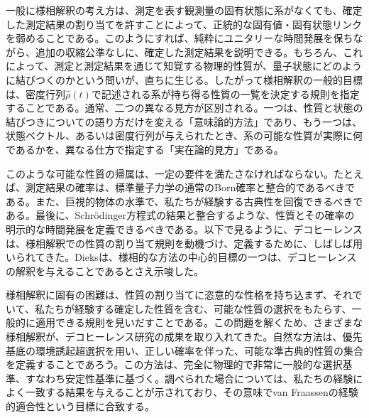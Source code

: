 \hypertarget{srcpage:345}{}\label{srcpage:345}
一般に様相解釈の考え方は、測定を表す観測量の固有状態に系がなくても、確定した測定結果の割り当てを許すことによって、正統的な固有値・固有状態リンクを弱めることである。このようにすれば、純粋にユニタリーな時間発展を保ちながら、追加の収縮公準なしに、確定した測定結果を説明できる。もちろん、これによって、測定と測定結果を通じて知覚する物理的性質が、量子状態にどのように結びつくのかという問いが、直ちに生じる。したがって様相解釈の一般的目標は、密度行列$\hat\rho(t)$で記述される系が持ち得る性質の一覧を決定する規則を指定することである。通常、二つの異なる見方が区別される。一つは、性質と状態の結びつきについての語り方だけを変える「意味論的方法」であり、もう一つは、状態ベクトル、あるいは密度行列が与えられたとき、系の可能な性質が実際に何であるかを、異なる仕方で指定する「実在論的見方」である。

このような可能な性質の帰属は、一定の要件を満たさなければならない。たとえば、測定結果の確率は、標準量子力学の通常のBorn確率と整合的であるべきである。また、巨視的物体の水準で、私たちが経験する古典性を回復できるべきである。最後に、Schrödinger方程式の結果と整合するような、性質とその確率の明示的な時間発展を定義できるべきである。以下で見るように、デコヒーレンスは、様相解釈での性質の割り当て規則を動機づけ、定義するために、しばしば用いられてきた。Dieks\cite{ref430,ref431}は、様相的な方法の中心的目標の一つは、デコヒーレンスの解釈を与えることであるとさえ示唆した。

様相解釈に固有の困難は、性質の割り当てに恣意的な性格を持ち込まず、それでいて、私たちが経験する確定した性質を含む、可能な性質の選択をもたらす、一般的に適用できる規則を見いだすことである。この問題を解くため、さまざまな様相解釈が、デコヒーレンス研究の成果を取り入れてきた。自然な方法は、優先基底の環境誘起超選択を用い、正しい確率を伴った、可能な準古典的性質の集合を定義することであろう。この方法は、完全に物理的で非常に一般的な選択基準、すなわち安定性基準に基づく。調べられた場合については、私たちの経験によく一致する結果を与えることが示されており、その意味でvan Fraassenの経験的適合性という目標に合致する。


